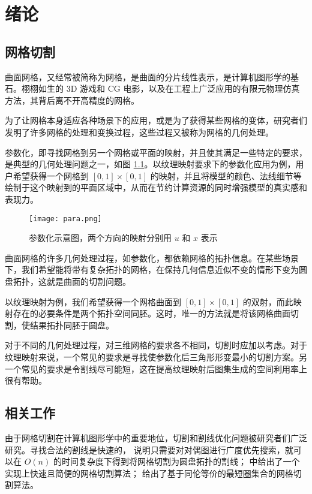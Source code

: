 
\chapter{绪论}

\section{网格切割}

曲面网格，又经常被简称为网格，是曲面的分片线性表示，是计算机图形学的基石。栩栩如生的 3D 游戏和 CG 电影，以及在工程上广泛应用的有限元物理仿真方法，其背后离不开高精度的网格。

为了让网格本身适应各种场景下的应用，或是为了获得某些网格的变体，研究者们发明了许多网格的处理和变换过程，这些过程又被称为网格的几何处理。

参数化，即寻找网格到另一个网格或平面的映射，并且使其满足一些特定的要求，是典型的几何处理问题之一，如图 \ref{fig:texmapping}。以纹理映射要求下的参数化应用为例，用户希望获得一个网格到 $ [0, 1] \times [0, 1] $ 的映射，并且将模型的颜色、法线细节等绘制于这个映射到的平面区域中，从而在节约计算资源的同时增强模型的真实感和表现力\cite{wikitexturemapping}。

\begin{figure}[h]
    \centering
    \texttt{[image: para.png]}
    \caption{参数化示意图，两个方向的映射分别用 $u$ 和 $x$ 表示}
    \label{fig:texmapping}
\end{figure}

曲面网格的许多几何处理过程，如参数化，都依赖网格的拓扑信息。在某些场景下，我们希望能将带有复杂拓扑的网格，在保持几何信息近似不变的情形下变为圆盘拓扑，这就是曲面的切割问题。

以纹理映射为例，我们希望获得一个网格曲面到 $ [0, 1] \times [0, 1] $ 的双射，而此映射存在的必要条件是两个拓扑空间同胚。这时，唯一的方法就是将该网格曲面切割，使结果拓扑同胚于圆盘。

对于不同的几何处理过程，对三维网格的要求各不相同，切割时应加以考虑。对于纹理映射来说，一个常见的要求是寻找使参数化后三角形形变最小的切割方案\cite{Gu2002}。另一个常见的要求是令割线尽可能短，这在提高纹理映射后图集生成的空间利用率上很有帮助\cite{atlasgen}。

\section{相关工作}

由于网格切割在计算机图形学中的重要地位，切割和割线优化问题被研究者们广泛研究。寻找合法的割线是快速的，\citet{Dey1995} 说明只需要对对偶图进行广度优先搜索，就可以在 $ O(n) $ 的时间复杂度下得到将网格切割为圆盘拓扑的割线；\citet{Gu2002} 中给出了一个实现上快速且简便的网格切割算法；\citet{DeVerdiere2005} 给出了基于同伦等价的最短圈集合的网格切割算法。

